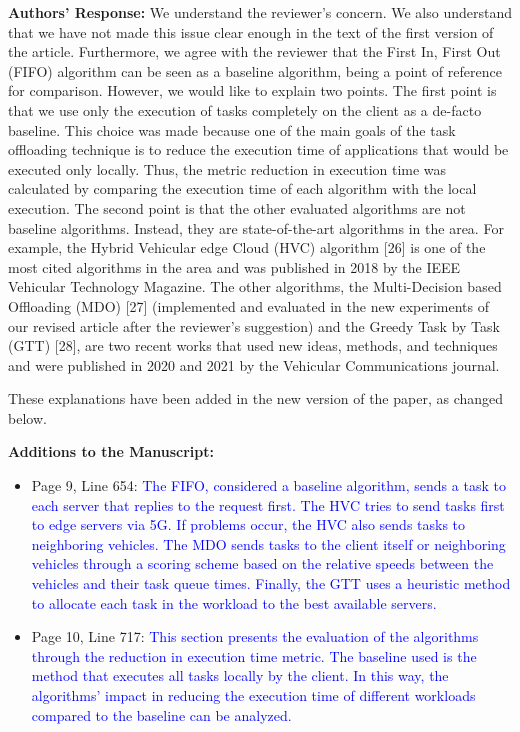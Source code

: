 \textbf{Authors' Response:} We understand the reviewer's concern. We also understand that we have not made this issue clear enough in the text of the first version of the article. Furthermore, we agree with the reviewer that the First In, First Out (FIFO) algorithm can be seen as a baseline algorithm, being a point of reference for comparison. However, we would like to explain two points. The first point is that we use only the execution of tasks completely on the client as a de-facto baseline. This choice was made because one of the main goals of the task offloading technique is to reduce the execution time of applications that would be executed only locally. Thus, the metric reduction in execution time was calculated by comparing the execution time of each algorithm with the local execution. The second point is that the other evaluated algorithms are not baseline algorithms. Instead, they are state-of-the-art algorithms in the area. For example, the Hybrid Vehicular edge Cloud (HVC) algorithm [26] is one of the most cited algorithms in the area and was published in 2018 by the IEEE Vehicular Technology Magazine. The other algorithms, the Multi-Decision based Offloading (MDO) [27] (implemented and evaluated in the new experiments of our revised article after the reviewer's suggestion) and the Greedy Task by Task (GTT) [28], are two recent works that used new ideas, methods, and techniques and were published in 2020 and 2021 by the Vehicular Communications journal.

These explanations have been added in the new version of the paper, as changed below.

\textbf{Additions to the Manuscript:}

\begin{itemize}
    \item Page 9, Line 654: \textcolor{blue}{The FIFO, considered a baseline algorithm, sends a task to each server that replies to the request first. The HVC tries to send tasks first to edge servers via 5G. If problems occur, the HVC also sends tasks to neighboring vehicles. The MDO sends tasks to the client itself or neighboring vehicles through a scoring scheme based on the relative speeds between the vehicles and their task queue times. Finally, the GTT uses a heuristic method to allocate each task in the workload to the best available servers.}
    \item Page 10, Line 717: \textcolor{blue}{This section presents the evaluation of the algorithms through the reduction in execution time metric. The baseline used is the method that executes all tasks locally by the client. In this way, the algorithms' impact in reducing the execution time of different workloads compared to the baseline can be analyzed.}
\end{itemize}


